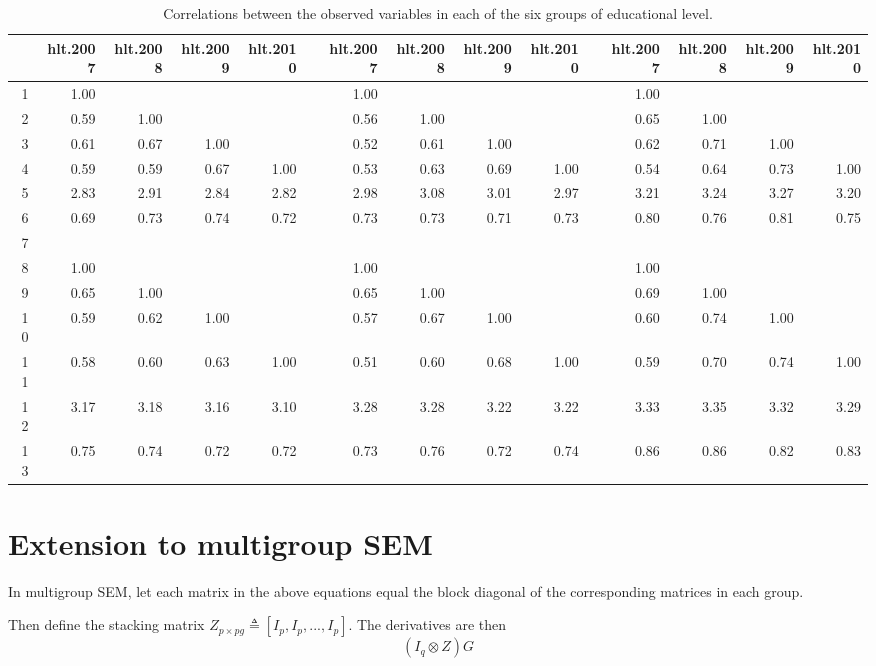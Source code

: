 \documentclass[a4paper, 11pt]{article}
\newcommand{\definedas}{\triangleq}
\newcommand{\kronprod}{\otimes}
\newcommand{\0}{\boldsymbol{0}}
\begin{document}
\begin{table}[ht]
\begin{center}
\begin{tabular}{rrrrrrrrrrrrrrr}
  \hline
 & hlt.2007 & hlt.2008 & hlt.2009 & hlt.2010 &  & hlt.2007 & hlt.2008 & hlt.2009 & hlt.2010 &  & hlt.2007 & hlt.2008 & hlt.2009 & hlt.2010 \\ 
  \hline
1 & 1.00 &  &  &  &  & 1.00 &  &  &  &  & 1.00 &  &  &  \\ 
  2 & 0.59 & 1.00 &  &  &  & 0.56 & 1.00 &  &  &  & 0.65 & 1.00 &  &  \\ 
  3 & 0.61 & 0.67 & 1.00 &  &  & 0.52 & 0.61 & 1.00 &  &  & 0.62 & 0.71 & 1.00 &  \\ 
  4 & 0.59 & 0.59 & 0.67 & 1.00 &  & 0.53 & 0.63 & 0.69 & 1.00 &  & 0.54 & 0.64 & 0.73 & 1.00 \\ 
  5 & 2.83 & 2.91 & 2.84 & 2.82 &  & 2.98 & 3.08 & 3.01 & 2.97 &  & 3.21 & 3.24 & 3.27 & 3.20 \\ 
  6 & 0.69 & 0.73 & 0.74 & 0.72 &  & 0.73 & 0.73 & 0.71 & 0.73 &  & 0.80 & 0.76 & 0.81 & 0.75 \\ 
  7 &  &  &  &  &  &  &  &  &  &  &  &  &  &  \\ 
  8 & 1.00 &  &  &  &  & 1.00 &  &  &  &  & 1.00 &  &  &  \\ 
  9 & 0.65 & 1.00 &  &  &  & 0.65 & 1.00 &  &  &  & 0.69 & 1.00 &  &  \\ 
  10 & 0.59 & 0.62 & 1.00 &  &  & 0.57 & 0.67 & 1.00 &  &  & 0.60 & 0.74 & 1.00 &  \\ 
  11 & 0.58 & 0.60 & 0.63 & 1.00 &  & 0.51 & 0.60 & 0.68 & 1.00 &  & 0.59 & 0.70 & 0.74 & 1.00 \\ 
  12 & 3.17 & 3.18 & 3.16 & 3.10 &  & 3.28 & 3.28 & 3.22 & 3.22 &  & 3.33 & 3.35 & 3.32 & 3.29 \\ 
  13 & 0.75 & 0.74 & 0.72 & 0.72 &  & 0.73 & 0.76 & 0.72 & 0.74 &  & 0.86 & 0.86 & 0.82 & 0.83 \\ 
   \hline
\end{tabular}
\end{center}
\caption{Correlations between the observed variables in each of the six groups of educational level.}
\end{table}
\fi



\section{Extension to multigroup SEM}

In multigroup SEM, let each matrix in the above equations equal the block
diagonal of the corresponding matrices in each group. 

Then define the stacking matrix $Z_{p \times pg} \definedas \left[I_p, I_p,
..., I_p\right]$. The derivatives are then 
$$
	(I_q \kronprod Z) G
$$
\end{document}
